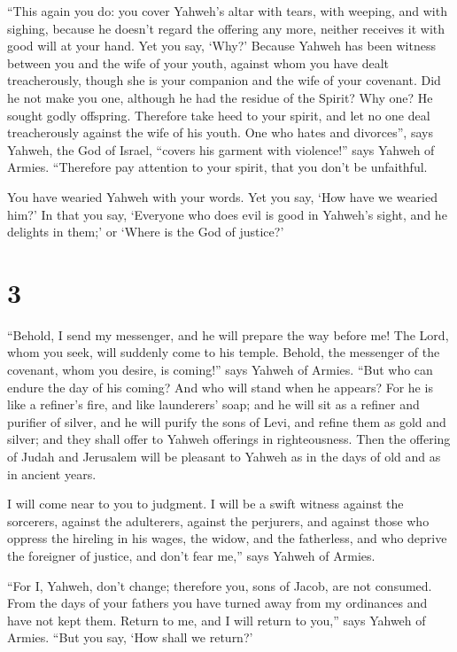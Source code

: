  ``This again you do: you cover Yahweh's altar with
tears, with weeping, and with sighing, because he doesn't regard the
offering any more, neither receives it with good will at your hand.
 Yet you say, `Why?' Because Yahweh has been witness
between you and the wife of your youth, against whom you have dealt
treacherously, though she is your companion and the wife of your
covenant.  Did he not make you one, although he had the
residue of the Spirit? Why one? He sought godly offspring. Therefore
take heed to your spirit, and let no one deal treacherously against the
wife of his youth.  One who hates and divorces'', says
Yahweh, the God of Israel, ``covers his garment with violence!'' says
Yahweh of Armies. ``Therefore pay attention to your spirit, that you
don't be unfaithful.

 You have wearied Yahweh with your words. Yet you say,
`How have we wearied him?' In that you say, `Everyone who does evil is
good in Yahweh's sight, and he delights in them;' or `Where is the God
of justice?'

\hypertarget{section-2}{%
\section{3}\label{section-2}}

 ``Behold, I send my messenger, and he will prepare the
way before me! The Lord, whom you seek, will suddenly come to his
temple. Behold, the messenger of the covenant, whom you desire, is
coming!'' says Yahweh of Armies.  ``But who can endure the
day of his coming? And who will stand when he appears? For he is like a
refiner's fire, and like launderers' soap;  and he will
sit as a refiner and purifier of silver, and he will purify the sons of
Levi, and refine them as gold and silver; and they shall offer to Yahweh
offerings in righteousness.  Then the offering of Judah
and Jerusalem will be pleasant to Yahweh as in the days of old and as in
ancient years.

 I will come near to you to judgment. I will be a swift
witness against the sorcerers, against the adulterers, against the
perjurers, and against those who oppress the hireling in his wages, the
widow, and the fatherless, and who deprive the foreigner of justice, and
don't fear me,'' says Yahweh of Armies.

 ``For I, Yahweh, don't change; therefore you, sons of
Jacob, are not consumed.  From the days of your fathers
you have turned away from my ordinances and have not kept them. Return
to me, and I will return to you,'' says Yahweh of Armies. ``But you say,
`How shall we return?'

